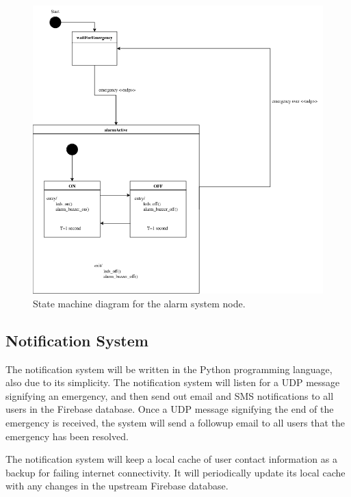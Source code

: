 \begin{figure}[H]
    \centering
    \includegraphics[width=\linewidth]{../assets/AlarmSystemStateMachine.png}
    \caption{State machine diagram for the alarm system node.}
\end{figure}

\subsection{Notification System}


The notification system will be written in the Python programming language, also due to its simplicity. The
notification system will listen for a UDP message signifying an emergency, and then send out email and SMS
notifications to all users in the Firebase database. Once a UDP message signifying the end of the emergency is
received, the system will send a followup email to all users that the emergency has been resolved.

The notification system will keep a local cache of user contact information as a backup for failing internet
connectivity. It will periodically update its local cache with any changes in the upstream Firebase database.

